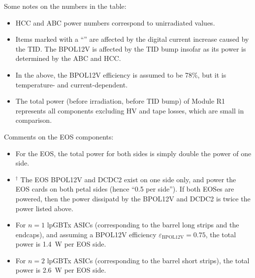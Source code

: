Some notes on the numbers in the table:
\begin{itemize}
\item HCC and ABC power numbers correspond to unirradiated values.
\item Items marked with a ``\tid'' are affected by the digital current increase caused by the TID.
The BPOL12V is affected by the TID bump insofar as its power is determined by the ABC and HCC.
\item In the above, the BPOL12V efficiency is assumed to be 78\%, but it is temperature- and
current-dependent.
\item The total power (before irradiation, before TID bump) of Module R1 represents
all components excluding HV and tape losses, which are small in comparison.
\end{itemize}

\noindent
Comments on the EOS components:

\begin{itemize}
\item For the EOS, the total power for both sides is simply double the power of one side.
\item $^\dagger$ The EOS BPOL12V and DCDC2 exist on one side only, and power the EOS cards on both petal
sides (hence ``0.5 per side''). If both EOSes are powered, then the power dissipatd by the BPOL12V and
DCDC2 is twice the power listed above.
\item For $n=1$ lpGBTx ASICs (corresponding to the barrel long strips and the endcaps),
and assuming a BPOL12V efficiency $\varepsilon_\text{BPOL12V}=0.75$,
the total power is 1.4~W per EOS side.
\item For $n=2$ lpGBTx ASICs (corresponding to the barrel short strips), the total power is 2.6~W per
EOS side.
\end{itemize}


